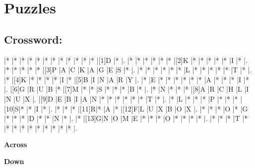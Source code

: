 \documentclass{article}
\begin{document}
\section*{Puzzles}

\subsection*{Crossword:}

\begin{Puzzle}{14}{14} %
|*    |*    |*    |*    |*    |*    |*    |*    |*    |*    |*    |*    |[1]D |*    |.
|*    |*    |*    |*    |*    |*    |[2]K |*    |*    |*    |*    |*    |I    |*    |.
|*    |*    |*    |*    |*    |[3]P |A    |C    |K    |A    |G    |E    |S    |*    |.
|*    |*    |*    |*    |*    |*    |L    |*    |*    |*    |*    |*    |T    |*    |.
|*    |[4]K |*    |*    |*    |*    |I    |*    |[5]B |I    |N    |A    |R    |Y    |.
|*    |E    |*    |*    |*    |*    |*    |*    |A    |*    |*    |*    |I    |*    |.
|[6]G |R    |U    |B    |*    |[7]M |*    |*    |S    |*    |*    |*    |B    |*    |.
|*    |N    |*    |*    |*    |[8]A |R    |C    |H    |L    |I    |N    |U    |X    |.
|[9]D |E    |B    |I    |A    |N    |*    |*    |*    |*    |*    |*    |T    |*    |.
|*    |L    |*    |*    |*    |P    |*    |*    |*    |[10]S|*    |*    |I    |*    |.
|*    |*    |*    |[11]R|*    |A    |*    |[12]F|L    |U    |X    |B    |O    |X    |.
|*    |*    |*    |O    |*    |G    |*    |*    |*    |D    |*    |*    |N    |*    |.
|*    |[13]G|N    |O    |M    |E    |*    |*    |*    |O    |*    |*    |*    |*    |.
|*    |*    |*    |T    |*    |*    |*    |*    |*    |*    |*    |*    |*    |*    |.
\end{Puzzle}


\begin{PuzzleClues}{\textbf{Across}} %
\end{PuzzleClues} %
%
\begin{PuzzleClues}{\textbf{Down}}
\end{PuzzleClues}
\end{document}
